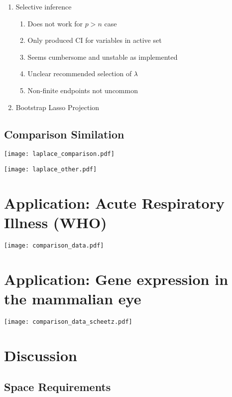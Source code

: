 \begin{enumerate}
\item Selective inference
\begin{enumerate}
\item Does not work for $p > n$ case
\item Only produced CI for variables in active set
\item Seems cumbersome and unstable as implemented
\item Unclear recommended selection of $\lambda$
\item Non-finite endpoints not uncommon
\end{enumerate}
\item{Bootstrap Lasso Projection}
\end{enumerate}

\subsection{Comparison Similation}

\texttt{[image: laplace\_comparison.pdf]}

\texttt{[image: laplace\_other.pdf]}

\section{Application: Acute Respiratory Illness (WHO)}

\texttt{[image: comparison\_data.pdf]}

\section{Application: Gene expression in the mammalian eye}

\texttt{[image: comparison\_data\_scheetz.pdf]}

\section{Discussion}

\subsection{Space Requirements}

